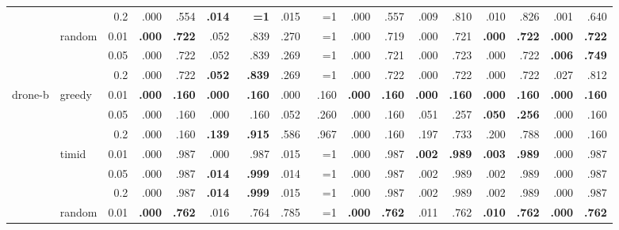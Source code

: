\documentclass{article}
\begin{document}
\begin{table}[h]
{\begin{tabular}{l@{\hskip 12pt} l@{\hskip 12pt} r@{\hskip 12pt} rr@{\hskip 12pt} rr@{\hskip 12pt} rr@{\hskip 12pt} rr@{\hskip 12pt} rr@{\hskip 12pt} rr@{\hskip 12pt} rr@{\hskip 12pt}}
 &  & 0.2 & .000 & .554 & \textbf{.014} & \textbf{~~{=}1} & .015 & ~~{=}1 & .000 & .557 & .009 & .810 & .010 & .826 & .001 & .640 \\
 \cmidrule(lr){2-17}
 & \multirow{3}{*}{random} & 0.01 & \textbf{.000} & \textbf{.722} & \cellcolor{red!20}.052 & \cellcolor{red!20}.839 & \cellcolor{red!20}.270 & \cellcolor{red!20}~~{=}1 & .000 & .719 & .000 & .721 & \textbf{.000} & \textbf{.722} & \textbf{.000} & \textbf{.722} \\
 &  & 0.05 & .000 & .722 & \cellcolor{red!20}.052 & \cellcolor{red!20}.839 & \cellcolor{red!20}.269 & \cellcolor{red!20}~~{=}1 & .000 & .721 & .000 & .723 & .000 & .722 & \textbf{.006} & \textbf{.749} \\
 &  & 0.2 & .000 & .722 & \textbf{.052} & \textbf{.839} & \cellcolor{red!20}.269 & \cellcolor{red!20}~~{=}1 & .000 & .722 & .000 & .722 & .000 & .722 & .027 & .812 \\
 \cmidrule(lr){1-17}
\multirow{9}{*}{drone-b} & \multirow{3}{*}{greedy} & 0.01 & \textbf{.000} & \textbf{.160} & \textbf{.000} & \textbf{.160} & .000 & .160 & \textbf{.000} & \textbf{.160} & \textbf{.000} & \textbf{.160} & \textbf{.000} & \textbf{.160} & \textbf{.000} & \textbf{.160} \\
 &  & 0.05 & .000 & .160 & .000 & .160 & \cellcolor{red!20}.052 & \cellcolor{red!20}.260 & .000 & .160 & \cellcolor{red!20}.051 & \cellcolor{red!20}.257 & \textbf{.050} & \textbf{.256} & .000 & .160 \\
 &  & 0.2 & .000 & .160 & \textbf{.139} & \textbf{.915} & \cellcolor{red!20}.586 & \cellcolor{red!20}.967 & .000 & .160 & .197 & .733 & .200 & .788 & .000 & .160 \\
 \cmidrule(lr){2-17}
 & \multirow{3}{*}{timid} & 0.01 & .000 & .987 & .000 & .987 & \cellcolor{red!20}.015 & \cellcolor{red!20}~~{=}1 & .000 & .987 & \textbf{.002} & \textbf{.989} & \textbf{.003} & \textbf{.989} & .000 & .987 \\
 &  & 0.05 & .000 & .987 & \textbf{.014} & \textbf{.999} & .014 & ~~{=}1 & .000 & .987 & .002 & .989 & .002 & .989 & .000 & .987 \\
 &  & 0.2 & .000 & .987 & \textbf{.014} & \textbf{.999} & .015 & ~~{=}1 & .000 & .987 & .002 & .989 & .002 & .989 & .000 & .987 \\
 \cmidrule(lr){2-17}
 & \multirow{3}{*}{random} & 0.01 & \textbf{.000} & \textbf{.762} & \cellcolor{red!20}.016 & \cellcolor{red!20}.764 & \cellcolor{red!20}.785 & \cellcolor{red!20}~~{=}1 & \textbf{.000} & \textbf{.762} & \cellcolor{red!20}.011 & \cellcolor{red!20}.762 & \textbf{.010} & \textbf{.762} & \textbf{.000} & \textbf{.762} \\

\end{tabular}}
\end{table}
\end{document}
